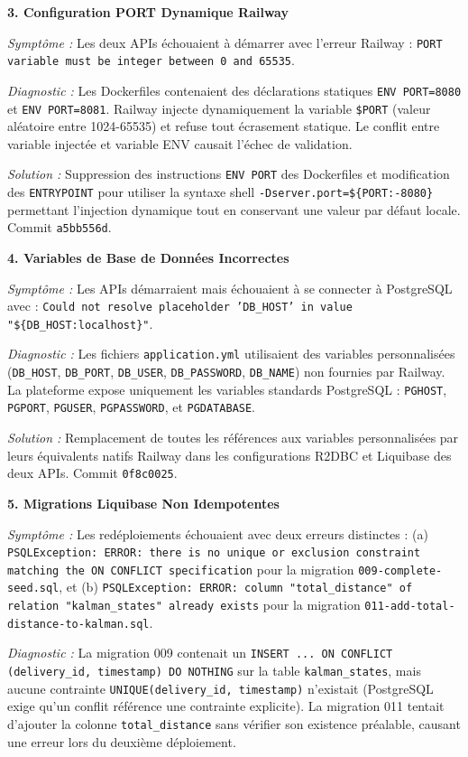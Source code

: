 \textbf{3. Configuration PORT Dynamique Railway}

\textit{Symptôme :} Les deux APIs échouaient à démarrer avec l'erreur Railway : \texttt{PORT variable must be integer between 0 and 65535}.

\textit{Diagnostic :} Les Dockerfiles contenaient des déclarations statiques \texttt{ENV PORT=8080} et \texttt{ENV PORT=8081}. Railway injecte dynamiquement la variable \texttt{\$PORT} (valeur aléatoire entre 1024-65535) et refuse tout écrasement statique. Le conflit entre variable injectée et variable ENV causait l'échec de validation.

\textit{Solution :} Suppression des instructions \texttt{ENV PORT} des Dockerfiles et modification des \texttt{ENTRYPOINT} pour utiliser la syntaxe shell \texttt{-Dserver.port=\$\{PORT:-8080\}} permettant l'injection dynamique tout en conservant une valeur par défaut locale. Commit \texttt{a5bb556d}.

\textbf{4. Variables de Base de Données Incorrectes}

\textit{Symptôme :} Les APIs démarraient mais échouaient à se connecter à PostgreSQL avec : \texttt{Could not resolve placeholder 'DB\_HOST' in value "\$\{DB\_HOST:localhost\}"}.

\textit{Diagnostic :} Les fichiers \texttt{application.yml} utilisaient des variables personnalisées (\texttt{DB\_HOST}, \texttt{DB\_PORT}, \texttt{DB\_USER}, \texttt{DB\_PASSWORD}, \texttt{DB\_NAME}) non fournies par Railway. La plateforme expose uniquement les variables standards PostgreSQL : \texttt{PGHOST}, \texttt{PGPORT}, \texttt{PGUSER}, \texttt{PGPASSWORD}, et \texttt{PGDATABASE}.

\textit{Solution :} Remplacement de toutes les références aux variables personnalisées par leurs équivalents natifs Railway dans les configurations R2DBC et Liquibase des deux APIs. Commit \texttt{0f8c0025}.

\textbf{5. Migrations Liquibase Non Idempotentes}

\textit{Symptôme :} Les redéploiements échouaient avec deux erreurs distinctes : (a) \texttt{PSQLException: ERROR: there is no unique or exclusion constraint matching the ON CONFLICT specification} pour la migration \texttt{009-complete-seed.sql}, et (b) \texttt{PSQLException: ERROR: column "total\_distance" of relation "kalman\_states" already exists} pour la migration \texttt{011-add-total-distance-to-kalman.sql}.

\textit{Diagnostic :} La migration 009 contenait un \texttt{INSERT ... ON CONFLICT (delivery\_id, timestamp) DO NOTHING} sur la table \texttt{kalman\_states}, mais aucune contrainte \texttt{UNIQUE(delivery\_id, timestamp)} n'existait (PostgreSQL exige qu'un conflit référence une contrainte explicite). La migration 011 tentait d'ajouter la colonne \texttt{total\_distance} sans vérifier son existence préalable, causant une erreur lors du deuxième déploiement.

